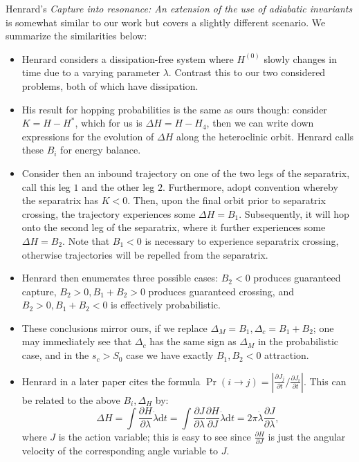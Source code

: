 \documentclass[11pt,
        usenames, %
        dvipsnames %
    ]{article}
\newcommand*{\pd}[2]{\frac{\partial#1}{\partial#2}}
\newcommand*{\abs}[1]{\left|#1\right|}
\newcommand*{\p}[1]{\left(#1\right)}
\begin{document}
Henrard's \emph{Capture into resonance: An extension of the use of adiabatic
invariants} is somewhat similar to our work but covers a slightly different
scenario. We summarize the similarities below:
\begin{itemize}
    \item Henrard considers a dissipation-free system where $H^{(0)}$ slowly
        changes in time due to a varying parameter $\lambda$. Contrast this to
        our two considered problems, both of which have dissipation.

    \item His result for hopping probabilities is the same as ours though:
        consider $K = H - H^*$, which for us is $\Delta H = H - H_4$, then
        we can write down expressions for the evolution of $\Delta H$ along the
        heteroclinic orbit. Henrard calls these $B_i$ for energy balance.

    \item Consider then an inbound trajectory on one of the two legs of the
        separatrix, call this leg $1$ and the other leg $2$. Furthermore, adopt
        convention whereby the separatrix has $K < 0$. Then, upon the final
        orbit prior to separatrix crossing, the trajectory experiences some
        $\Delta H = B_1$. Subsequently, it will hop onto the second leg of the
        separatrix, where it further experiences some $\Delta H = B_2$. Note
        that $B_1 < 0$ is necessary to experience separatrix crossing, otherwise
        trajectories will be repelled from the separatrix.

    \item Henrard then enumerates three possible cases: $B_2 < 0$ produces
        guaranteed capture, $B_2 > 0, B_1 + B_2 > 0$ produces guaranteed
        crossing, and $B_2 > 0, B_1 + B_2 < 0$ is effectively probabilistic.

    \item These conclusions mirror ours, if we replace $\Delta_M = B_1, \Delta_c
        = B_1 + B_2$; one may immediately see that $\Delta_c$ has the same sign
        as $\Delta_M$ in the probabilistic case, and in the $s_c > S_{0}$ case
        we have exactly $B_1, B_2 < 0$ attraction.

    \item Henrard in a later paper cites the formula $\Pr\p{i \to j} =
        \abs{\pd{J_j}{t} / \pd{J_i}{t}}$. This can be related to the above
        $B_i, \Delta_H$ by:
        \begin{equation}
            \Delta H = \int \pd{H}{\lambda}\dot{\lambda}\mathrm{d}t
                = \int \pd{J}{\lambda}\pd{H}{J}\dot{\lambda}\mathrm{d}t
                = 2\pi \dot{\lambda}\pd{J}{\lambda},
        \end{equation}
        where $J$ is the action variable; this is easy to see since $\pd{H}{J}$
        is just the angular velocity of the corresponding angle variable to $J$.
\end{itemize}
\end{document}
